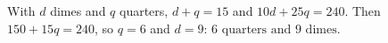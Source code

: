 With $d$ dimes and $q$ quarters, $d+q=15$ and $10d+25q=240$. Then $150+15q=240$, so $q=6$ and $d=9$: $\boxed{6\text{ quarters and }9\text{ dimes}}$.
